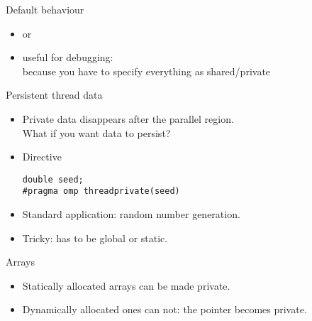 \begin{frame}[containsverbatim]{Default behaviour}
  \begin{itemize}
  \item {} or 
  \item useful for debugging: \\ because you have
    to specify everything as shared/private
  \end{itemize}
\end{frame}

\begin{frame}[containsverbatim]{Persistent thread data}
  \begin{itemize}
  \item Private data disappears after the parallel region.\\
    What if you want data to persist?
  \item Directive 
\begin{verbatim}
double seed;
#pragma omp threadprivate(seed)
\end{verbatim}
\item Standard application: random number generation.
\item Tricky: has to be global or static.
  \end{itemize}
\end{frame}

\begin{frame}[containsverbatim]{Arrays}
  \begin{itemize}
  \item Statically allocated arrays can be made private.
  \item Dynamically allocated ones can not: the pointer becomes private.
  \end{itemize}
\end{frame}

\endinput

\begin{frame}[containsverbatim]{}
  \begin{itemize}
  \item 
  \end{itemize}
\end{frame}

